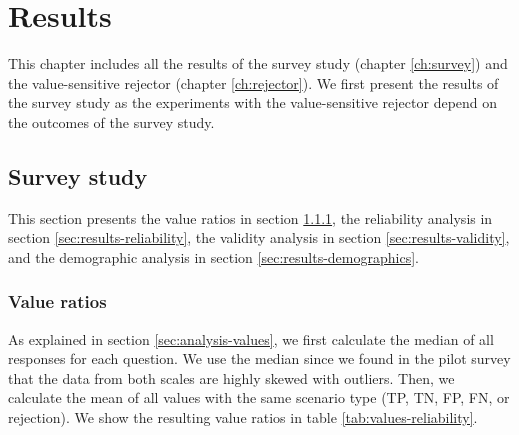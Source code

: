 \chapter{Results}
This chapter includes all the results of the survey study (chapter \ref{ch:survey}) and the value-sensitive rejector (chapter \ref{ch:rejector}).
%
We first present the results of the survey study as the experiments with the value-sensitive rejector depend on the outcomes of the survey study.

\section{Survey study}
\label{sec:results-survey-study}
This section presents the value ratios in section \ref{sec:results-value-ratios}, the reliability analysis in section \ref{sec:results-reliability}, the validity analysis in section \ref{sec:results-validity}, and the demographic analysis in section \ref{sec:results-demographics}.
%


\subsection{Value ratios}
\label{sec:results-value-ratios}
As explained in section \ref{sec:analysis-values}, we first calculate the median of all responses for each question.
%
We use the median since we found in the pilot survey that the data from both scales are highly skewed with outliers.
%
Then, we calculate the mean of all values with the same scenario type (TP, TN, FP, FN, or rejection).
%
We show the resulting value ratios in table \ref{tab:values-reliability}.

